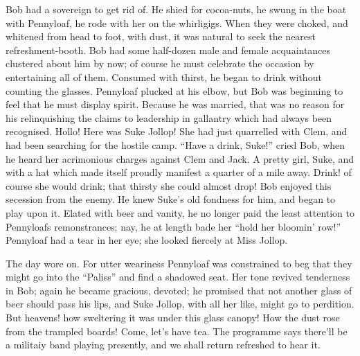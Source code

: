 Bob had a sovereign to get rid of. He shied for cocoa-nuts, he swung in
the boat with Pennyloaf, he rode with her on the whirligigs. When they
were choked, and whitened from head to foot, with dust, it was natural
to seek the nearest refreshment-booth. Bob had some half-dozen male and
female acquaintances clustered about him by now; of course he must
celebrate the occasion by entertaining all of them. Consumed with
thirst, he began to drink without counting the glasses. Pennyloaf
plucked at his elbow, but Bob was beginning to feel that he must display
spirit. Because he was married, that was no reason for his relinquishing
the claims to leadership in gallantry which had always been recognised.
Hollo! Here was Suke Jollop! She had just quarrelled with Clem, and had
been searching for the hostile camp. {}``Have a drink, Suke!'' cried
Bob, when he heard her acrimonious charges against Clem and Jack. A
pretty girl, Suke, and with a hat which made itself proudly manifest a
quarter of a mile away. Drink! of course she would drink; that thirsty
she could almost drop! Bob enjoyed this secession from the enemy. He
knew Suke's old fondness for him, and began to play upon it. Elated with
beer and vanity, he no longer paid the least attention to Pennyloafs
remonstrances; nay, he at length bade her ``hold her bloomin' row!''
Pennyloaf had a tear in her eye; she looked fiercely at Miss Jollop.

The day wore on. For utter weariness Pennyloaf was constrained to beg
that they might go into the ``Paliss'' and find a shadowed seat. Her
tone revived tenderness in Bob; again he became gracious, devoted; he
promised that not another glass of beer should pass his lips, and Suke
Jollop, with all her like, might go to perdition. But heavens! how
sweltering it was under this glass canopy! How the dust rose from the
trampled boards! {}Come, let's have tea. The programme says there'll be
a militaiy band playing presently, and we shall return refreshed to hear
it.

